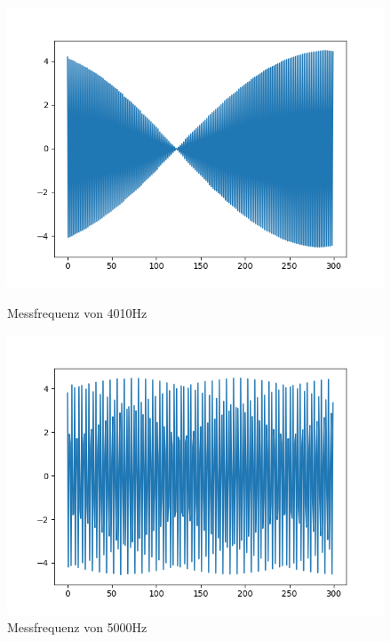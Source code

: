 \documentclass[12pt, oneside, a4paper, \docLanguage]{report}
\begin{document}
\begin{figure}[H]
   \begin{minipage}[b]{.5\linewidth} %
      \includegraphics[width=\linewidth]{media/4010Hz}
      \caption{Messfrequenz von 4010Hz}
   \end{minipage}
   \begin{minipage}[b]{.5\linewidth} %
      \includegraphics[width=\linewidth]{media/5000Hz}
      \caption{Messfrequenz von 5000Hz}
   \end{minipage}
\end{figure}
\end{document}

